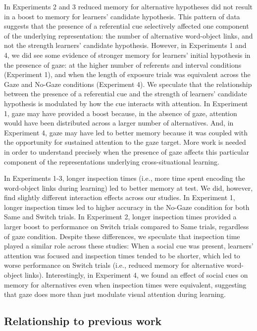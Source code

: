\documentclass[authoryear, review]{elsarticle}
\begin{document}
In Experiments 2 and 3 reduced memory for alternative hypotheses did not
result in a boost to memory for learners' candidate hypothesis. This
pattern of data suggests that the presence of a referential cue
selectively affected one component of the underlying representation: the
number of alternative word-object links, and not the strength learners'
candidate hypothesis. However, in Experiments 1 and 4, we did see some
evidence of stronger memory for learners' initial hypothesis in the
presence of gaze: at the higher number of referents and interval
conditions (Experiment 1), and when the length of exposure trials was
equivalent across the Gaze and No-Gaze conditions (Experiment 4). We
speculate that the relationship between the presence of a referential
cue and the strength of learners' candidate hypothesis is modulated by
how the cue interacts with attention. In Experiment 1, gaze may have
provided a boost because, in the absence of gaze, attention would have
been distributed across a larger number of alternatives. And, in
Experiment 4, gaze may have led to better memory because it was coupled
with the opportunity for sustained attention to the gaze target. More
work is needed in order to understand precisely when the presence of
gaze affects this particular component of the representations underlying
cross-situational learning.

In Experiments 1-3, longer inspection times (i.e., more time spent
encoding the word-object links during learning) led to better memory at
test. We did, however, find slightly different interaction effects
across our studies. In Experiment 1, longer inspection times led to
higher accuracy in the No-Gaze condition for both Same and Switch
trials. In Experiment 2, longer inspection times provided a larger boost
to performance on Switch trials compared to Same trials, regardless of
gaze condition. Despite these differences, we speculate that inspection
time played a similar role across these studies: When a social cue was
present, learners' attention was focused and inspection times tended to
be shorter, which led to worse performance on Switch trials (i.e.,
reduced memory for alternative word-object links). Interestingly, in
Experiment 4, we found an effect of social cues on memory for
alternatives even when inspection times were equivalent, suggesting that
gaze does more than just modulate visual attention during learning.

\subsection{Relationship to previous
work}\label{relationship-to-previous-work}
\end{document}
